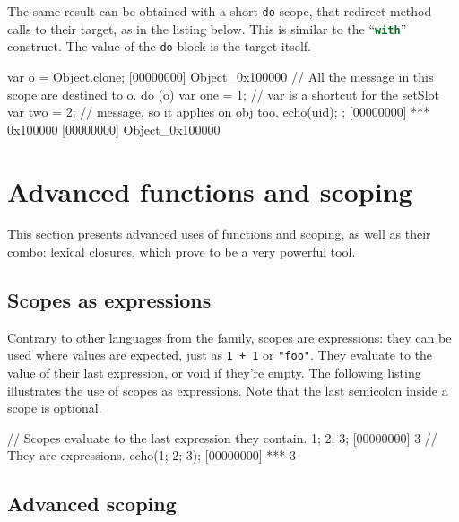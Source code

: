 The same result can be obtained with a short \lstinline|do| scope,
that redirect method calls to their target, as in the listing
below. This is similar to the \pascal
``\lstinline[language=Pascal]{with}'' construct.  The value of the
\lstinline{do}-block is the target itself.

\begin{urbiscript}
var o = Object.clone;
[00000000] Object_0x100000
// All the message in this scope are destined to o.
do (o)
{
 var one = 1; // var is a shortcut for the setSlot
 var two = 2; // message, so it applies on obj too.
 echo(uid);
};
[00000000] *** 0x100000
[00000000] Object_0x100000
\end{urbiscript}



\chapter{Advanced functions and scoping}
\label{sec:tut:function}

This section presents advanced uses of functions and scoping, as well
as their combo: lexical closures, which prove to be a very powerful
tool.

\section{Scopes as expressions}

Contrary to other languages from the \C family, scopes are
expressions: they can be used where values are expected, just as
\lstinline|1 + 1| or \lstinline|"foo"|.
They evaluate to the value of their last expression, or void if they're
empty. The following listing illustrates the use of scopes as
expressions. Note that the last semicolon inside a scope is optional.

\begin{urbiscript}
// Scopes evaluate to the last expression they contain.
{ 1; 2; 3};
[00000000] 3
// They are expressions.
echo({1; 2; 3});
[00000000] *** 3
\end{urbiscript}

\section{Advanced scoping}

